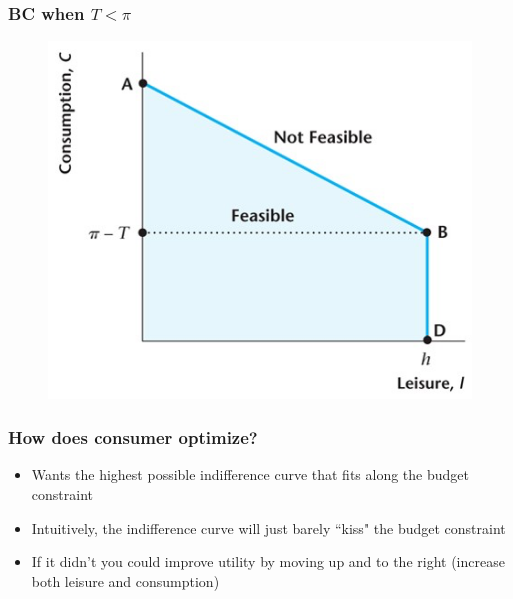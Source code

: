 \documentclass{beamer}
\begin{document}
\begin{frame}
\frametitle[alignment=center]{BC when $T<\pi$}
\begin{figure}
\centering
\includegraphics[scale=0.5]{Figures/W_Fig_4pt4.png}
\end{figure}
\end{frame}

\begin{frame}
\frametitle[alignment=center]{How does consumer optimize?}
\begin{itemize}
\item Wants the highest possible indifference curve that fits along the budget constraint
\bigskip
\item Intuitively, the indifference curve will just barely ``kiss" the budget constraint
\bigskip
\item If it didn't you could improve utility by moving up and to the right (increase both leisure and consumption)
\end{itemize}
\end{frame}
\end{document}

